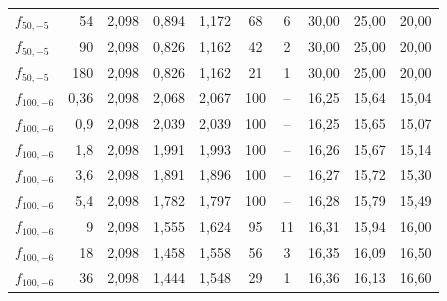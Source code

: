 \begin{tabular}{lr|ccc|cc|ccc}
$f_{50,-5}$ & 54 & 2{,}098 & 0{,}894 & 1{,}172 & 68 & 6 & 30{,}00 & 25{,}00 & 20{,}00\\
$f_{50,-5}$ & 90 & 2{,}098 & 0{,}826 & 1{,}162 & 42 & 2 & 30{,}00 & 25{,}00 & 20{,}00\\
$f_{50,-5}$ & 180 & 2{,}098 & 0{,}826 & 1{,}162 & 21 & 1 & 30{,}00 & 25{,}00 & 20{,}00\\
$f_{100,-6}$ & 0{,}36 & 2{,}098 & 2{,}068 & 2{,}067 & 100 & -- & 16{,}25 & 15{,}64 & 15{,}04\\
$f_{100,-6}$ & 0{,}9 & 2{,}098 & 2{,}039 & 2{,}039 & 100 & -- & 16{,}25 & 15{,}65 & 15{,}07\\
$f_{100,-6}$ & 1{,}8 & 2{,}098 & 1{,}991 & 1{,}993 & 100 & -- & 16{,}26 & 15{,}67 & 15{,}14\\
$f_{100,-6}$ & 3{,}6 & 2{,}098 & 1{,}891 & 1{,}896 & 100 & -- & 16{,}27 & 15{,}72 & 15{,}30\\
$f_{100,-6}$ & 5{,}4 & 2{,}098 & 1{,}782 & 1{,}797 & 100 & -- & 16{,}28 & 15{,}79 & 15{,}49\\
$f_{100,-6}$ & 9 & 2{,}098 & 1{,}555 & 1{,}624 & 95 & 11 & 16{,}31 & 15{,}94 & 16{,}00\\
$f_{100,-6}$ & 18 & 2{,}098 & 1{,}458 & 1{,}558 & 56 & 3 & 16{,}35 & 16{,}09 & 16{,}50\\
$f_{100,-6}$ & 36 & 2{,}098 & 1{,}444 & 1{,}548 & 29 & 1 & 16{,}36 & 16{,}13 & 16{,}60\\
\bottomrule
\end{tabular}
